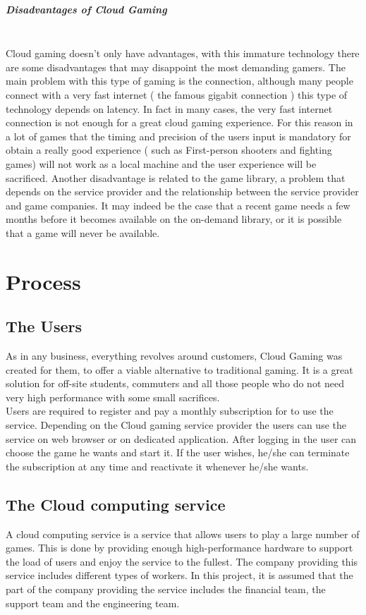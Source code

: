 \documentclass[a4paper,12pt]{report}
\begin{document}
\paragraph{Disadvantages of Cloud Gaming\\\\}
Cloud gaming doesn't only have advantages, with this immature technology there are some disadvantages that may disappoint the most demanding gamers. The main problem with this type of gaming is the connection, although many people connect with a very fast internet ( the famous gigabit connection ) this type of technology depends on latency. In fact in many cases, the very fast internet connection is not enough for a great cloud gaming experience. For this reason in a lot of games that the timing and precision of the users input is mandatory for obtain a really good experience ( such as First-person shooters and fighting games) will not work as a local machine and the user experience will be sacrificed. Another disadvantage is related to the game library, a problem that depends on the service provider and the relationship between the service provider and game companies. It may indeed be the case that a recent game needs a few months before it becomes available on the on-demand library, or it is possible that a game will never be available. 
\chapter{Process}
\label{cap2}
\section{The Users}
As in any business, everything revolves around customers, Cloud Gaming was created for them, to offer a viable alternative to traditional gaming. It is a great solution for off-site students, commuters and all those people who do not need very high performance with some small sacrifices. \\
Users are required to register and pay a monthly subscription for to use the service.  Depending on the Cloud gaming service provider the users can use the service on web browser or on dedicated application. After logging in the user can choose the game he wants and start it. 
If the user wishes, he/she can terminate the subscription at any time and reactivate it whenever he/she wants. 
%
\section{The Cloud computing service }
A cloud computing service is a service that allows users to play a large number of games. This is done by providing enough high-performance hardware to support the load of users and enjoy the service to the fullest.  The company providing this service includes different types of workers. In this project, it is assumed that the part of the company providing the service includes the financial team, the support team and the engineering team.
%
\end{document}
